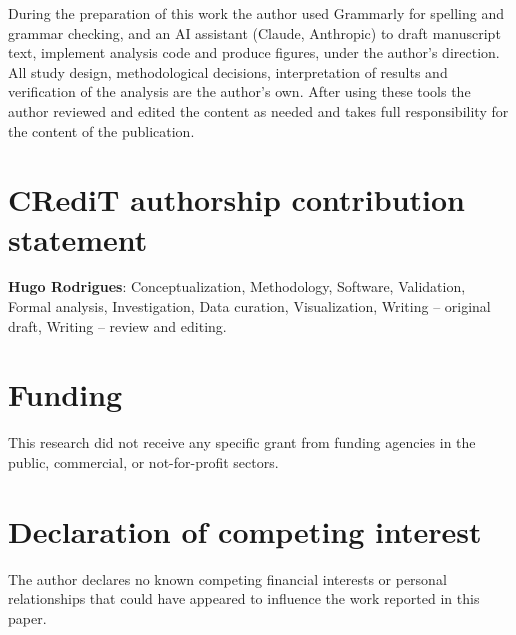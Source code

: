 \documentclass[preprint,12pt,authoryear]{elsarticle}
\begin{document}
During the preparation of this work the author used Grammarly for spelling and
grammar checking, and an AI assistant (Claude, Anthropic) to draft manuscript
text, implement analysis code and produce figures, under the author's direction.
All study design, methodological decisions, interpretation of results and
verification of the analysis are the author's own. After using these tools the
author reviewed and edited the content as needed and takes full responsibility
for the content of the publication.

\section*{CRediT authorship contribution statement}

\textbf{Hugo Rodrigues}: Conceptualization, Methodology, Software, Validation,
Formal analysis, Investigation, Data curation, Visualization, Writing --
original draft, Writing -- review and editing.

\section*{Funding}

This research did not receive any specific grant from funding agencies in the
public, commercial, or not-for-profit sectors.

\section*{Declaration of competing interest}

The author declares no known competing financial interests or personal
relationships that could have appeared to influence the work reported in this
paper.



\end{document}
